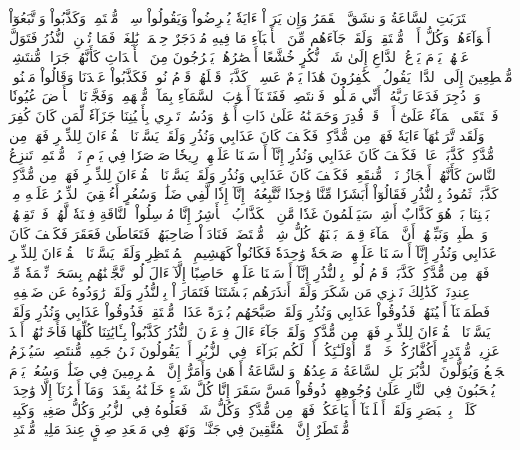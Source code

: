 ٱقۡتَرَبَتِ ٱلسَّاعَةُ وَٱنشَقَّ ٱلۡقَمَرُ
وَإِن يَرَوۡاْ ءَايَةٗ يُعۡرِضُواْ وَيَقُولُواْ سِحۡرٞ مُّسۡتَمِرّٞ
وَكَذَّبُواْ وَٱتَّبَعُوٓاْ أَهۡوَآءَهُمۡۚ وَكُلُّ أَمۡرٖ مُّسۡتَقِرّٞ
وَلَقَدۡ جَآءَهُم مِّنَ ٱلۡأَنۢبَآءِ مَا فِيهِ مُزۡدَجَرٌ
حِكۡمَةُۢ بَٰلِغَةٞۖ فَمَا تُغۡنِ ٱلنُّذُرُ
فَتَوَلَّ عَنۡهُمۡۘ يَوۡمَ يَدۡعُ ٱلدَّاعِ إِلَىٰ شَيۡءٖ نُّكُرٍ
خُشَّعًا أَبۡصَٰرُهُمۡ يَخۡرُجُونَ مِنَ ٱلۡأَجۡدَاثِ كَأَنَّهُمۡ جَرَادٞ مُّنتَشِرٞ
مُّهۡطِعِينَ إِلَى ٱلدَّاعِۖ يَقُولُ ٱلۡكَٰفِرُونَ هَٰذَا يَوۡمٌ عَسِرٞ
۞كَذَّبَتۡ قَبۡلَهُمۡ قَوۡمُ نُوحٖ فَكَذَّبُواْ عَبۡدَنَا وَقَالُواْ مَجۡنُونٞ وَٱزۡدُجِرَ
فَدَعَا رَبَّهُۥٓ أَنِّي مَغۡلُوبٞ فَٱنتَصِرۡ
فَفَتَحۡنَآ أَبۡوَٰبَ ٱلسَّمَآءِ بِمَآءٖ مُّنۡهَمِرٖ
وَفَجَّرۡنَا ٱلۡأَرۡضَ عُيُونٗا فَٱلۡتَقَى ٱلۡمَآءُ عَلَىٰٓ أَمۡرٖ قَدۡ قُدِرَ
وَحَمَلۡنَٰهُ عَلَىٰ ذَاتِ أَلۡوَٰحٖ وَدُسُرٖ
تَجۡرِي بِأَعۡيُنِنَا جَزَآءٗ لِّمَن كَانَ كُفِرَ
وَلَقَد تَّرَكۡنَٰهَآ ءَايَةٗ فَهَلۡ مِن مُّدَّكِرٖ
فَكَيۡفَ كَانَ عَذَابِي وَنُذُرِ
وَلَقَدۡ يَسَّرۡنَا ٱلۡقُرۡءَانَ لِلذِّكۡرِ فَهَلۡ مِن مُّدَّكِرٖ
كَذَّبَتۡ عَادٞ فَكَيۡفَ كَانَ عَذَابِي وَنُذُرِ
إِنَّآ أَرۡسَلۡنَا عَلَيۡهِمۡ رِيحٗا صَرۡصَرٗا فِي يَوۡمِ نَحۡسٖ مُّسۡتَمِرّٖ
تَنزِعُ ٱلنَّاسَ كَأَنَّهُمۡ أَعۡجَازُ نَخۡلٖ مُّنقَعِرٖ
فَكَيۡفَ كَانَ عَذَابِي وَنُذُرِ
وَلَقَدۡ يَسَّرۡنَا ٱلۡقُرۡءَانَ لِلذِّكۡرِ فَهَلۡ مِن مُّدَّكِرٖ
كَذَّبَتۡ ثَمُودُ بِٱلنُّذُرِ
فَقَالُوٓاْ أَبَشَرٗا مِّنَّا وَٰحِدٗا نَّتَّبِعُهُۥٓ إِنَّآ إِذٗا لَّفِي ضَلَٰلٖ وَسُعُرٍ
أَءُلۡقِيَ ٱلذِّكۡرُ عَلَيۡهِ مِنۢ بَيۡنِنَا بَلۡ هُوَ كَذَّابٌ أَشِرٞ
سَيَعۡلَمُونَ غَدٗا مَّنِ ٱلۡكَذَّابُ ٱلۡأَشِرُ
إِنَّا مُرۡسِلُواْ ٱلنَّاقَةِ فِتۡنَةٗ لَّهُمۡ فَٱرۡتَقِبۡهُمۡ وَٱصۡطَبِرۡ
وَنَبِّئۡهُمۡ أَنَّ ٱلۡمَآءَ قِسۡمَةُۢ بَيۡنَهُمۡۖ كُلُّ شِرۡبٖ مُّحۡتَضَرٞ
فَنَادَوۡاْ صَاحِبَهُمۡ فَتَعَاطَىٰ فَعَقَرَ
فَكَيۡفَ كَانَ عَذَابِي وَنُذُرِ
إِنَّآ أَرۡسَلۡنَا عَلَيۡهِمۡ صَيۡحَةٗ وَٰحِدَةٗ فَكَانُواْ كَهَشِيمِ ٱلۡمُحۡتَظِرِ
وَلَقَدۡ يَسَّرۡنَا ٱلۡقُرۡءَانَ لِلذِّكۡرِ فَهَلۡ مِن مُّدَّكِرٖ
كَذَّبَتۡ قَوۡمُ لُوطِۭ بِٱلنُّذُرِ
إِنَّآ أَرۡسَلۡنَا عَلَيۡهِمۡ حَاصِبًا إِلَّآ ءَالَ لُوطٖۖ نَّجَّيۡنَٰهُم بِسَحَرٖ
نِّعۡمَةٗ مِّنۡ عِندِنَاۚ كَذَٰلِكَ نَجۡزِي مَن شَكَرَ
وَلَقَدۡ أَنذَرَهُم بَطۡشَتَنَا فَتَمَارَوۡاْ بِٱلنُّذُرِ
وَلَقَدۡ رَٰوَدُوهُ عَن ضَيۡفِهِۦ فَطَمَسۡنَآ أَعۡيُنَهُمۡ فَذُوقُواْ عَذَابِي وَنُذُرِ
وَلَقَدۡ صَبَّحَهُم بُكۡرَةً عَذَابٞ مُّسۡتَقِرّٞ
فَذُوقُواْ عَذَابِي وَنُذُرِ
وَلَقَدۡ يَسَّرۡنَا ٱلۡقُرۡءَانَ لِلذِّكۡرِ فَهَلۡ مِن مُّدَّكِرٖ
وَلَقَدۡ جَآءَ ءَالَ فِرۡعَوۡنَ ٱلنُّذُرُ
كَذَّبُواْ بِـَٔايَٰتِنَا كُلِّهَا فَأَخَذۡنَٰهُمۡ أَخۡذَ عَزِيزٖ مُّقۡتَدِرٍ
أَكُفَّارُكُمۡ خَيۡرٞ مِّنۡ أُوْلَـٰٓئِكُمۡ أَمۡ لَكُم بَرَآءَةٞ فِي ٱلزُّبُرِ
أَمۡ يَقُولُونَ نَحۡنُ جَمِيعٞ مُّنتَصِرٞ
سَيُهۡزَمُ ٱلۡجَمۡعُ وَيُوَلُّونَ ٱلدُّبُرَ
بَلِ ٱلسَّاعَةُ مَوۡعِدُهُمۡ وَٱلسَّاعَةُ أَدۡهَىٰ وَأَمَرُّ
إِنَّ ٱلۡمُجۡرِمِينَ فِي ضَلَٰلٖ وَسُعُرٖ
يَوۡمَ يُسۡحَبُونَ فِي ٱلنَّارِ عَلَىٰ وُجُوهِهِمۡ ذُوقُواْ مَسَّ سَقَرَ
إِنَّا كُلَّ شَيۡءٍ خَلَقۡنَٰهُ بِقَدَرٖ
وَمَآ أَمۡرُنَآ إِلَّا وَٰحِدَةٞ كَلَمۡحِۭ بِٱلۡبَصَرِ
وَلَقَدۡ أَهۡلَكۡنَآ أَشۡيَاعَكُمۡ فَهَلۡ مِن مُّدَّكِرٖ
وَكُلُّ شَيۡءٖ فَعَلُوهُ فِي ٱلزُّبُرِ
وَكُلُّ صَغِيرٖ وَكَبِيرٖ مُّسۡتَطَرٌ
إِنَّ ٱلۡمُتَّقِينَ فِي جَنَّـٰتٖ وَنَهَرٖ
فِي مَقۡعَدِ صِدۡقٍ عِندَ مَلِيكٖ مُّقۡتَدِرِۭ